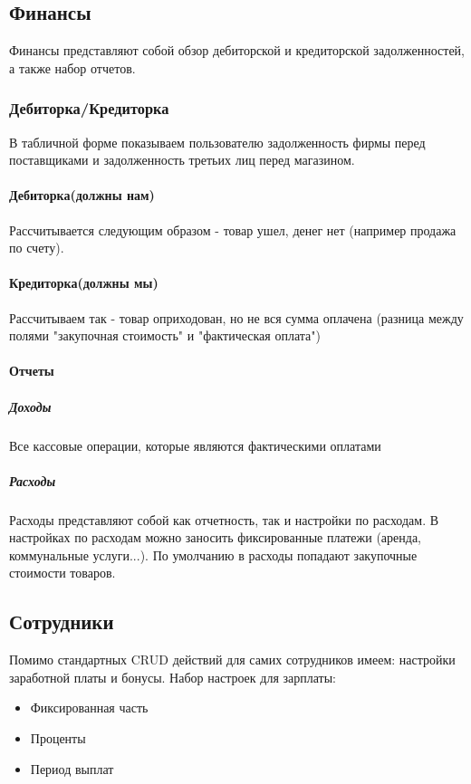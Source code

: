 \documentclass[DIV=calc, paper=a4, fontsize=11pt]{scrartcl} %
\begin{document}
\subsection{Финансы}

Финансы представляют собой обзор дебиторской и кредиторской задолженностей, а также набор отчетов.

\subsubsection{Дебиторка/Кредиторка}

В табличной форме показываем пользователю задолженность фирмы перед поставщиками и задолженность третьих лиц перед магазином.

\paragraph{Дебиторка(должны нам)}
Рассчитывается следующим образом - товар ушел, денег нет (например продажа по счету).

\paragraph{Кредиторка(должны мы)}
Рассчитываем так - товар оприходован, но не вся сумма оплачена (разница между полями "закупочная стоимость" и "фактическая оплата")

\paragraph{Отчеты}
\subparagraph{Доходы}
Все кассовые операции, которые являются фактическими оплатами

\subparagraph{Расходы}
Расходы представляют собой как отчетность, так и настройки по расходам. В настройках по расходам можно заносить фиксированные платежи (аренда, коммунальные услуги...). По умолчанию в расходы попадают закупочные стоимости товаров.

\subsection{Сотрудники}

Помимо стандартных CRUD действий для самих сотрудников имеем: настройки заработной платы и бонусы. Набор настроек для зарплаты:

\begin{itemize}
	\item Фиксированная часть
	\item Проценты
	\item Период выплат
\end{itemize}
\end{document}
